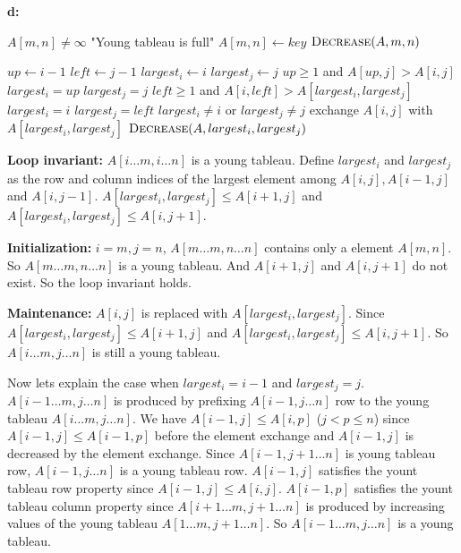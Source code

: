 \documentclass{book}
\begin{document}
\begin{CJK}{UTF8}{gkai}
\textbf{d:}
\begin{codebox}
\li \If $A[m,n] \ne \infty$
\li \Then \Error "Young tableau is full"
\End
\li $A[m,n] \gets key$
\li $\textnormal{\scshape Decrease}(A,m,n)$
\end{codebox}

\begin{codebox}
\li $up \gets i-1$
\li $left \gets j-1$
\li $largest_i \gets i$
\li $largest_j \gets j$
\li \If $up \ge 1$ and $A[up, j] > A[i,j]$
\li \Then $largest_i = up$
\li $largest_j = j$
\End
\li \If $left \ge 1$ and $A[i, left] > A[largest_i, largest_j]$
\li \Then $largest_i = i$
\li $largest_j = left$
\End
\li \If $largest_i \ne i$ or $largest_j \ne j$
\li \Then exchange $A[i,j]$ with $A[largest_i, largest_j]$
\li $\textnormal{\scshape Decrease}(A, largest_i, largest_j)$
\End
\end{codebox}
\textbf{Loop invariant:} $A[i\dots m, i\dots n]$ is a young tableau. Define 
$largest_i$ and $largest_j$ as the row and column indices of the largest element 
among $A[i,j], A[i-1,j]$ and $A[i,j-1]$. $A[largest_i, largest_j] \le A[i+1,j]$ 
and $A[largest_i, largest_j] \le A[i,j+1]$.

\textbf{Initialization:} $i=m, j=n$, $A[m\dots m, n\dots n]$ contains only a 
element $A[m,n]$. So $A[m\dots m,n\dots n]$ is a young tableau. And $A[i+1,j]$ 
and $A[i,j+1]$ do not exist. So the loop invariant holds.

\textbf{Maintenance:} $A[i,j]$ is replaced with $A[largest_i, largest_j]$. Since 
$A[largest_i, largest_j] \le A[i+1,j]$ and $A[largest_i, largest_j] \le 
A[i,j+1]$. So $A[i\dots m, j\dots n]$ is still a young tableau. 

Now lets explain the case when $largest_i = i-1$ and $largest_j = j$.  
$A[i-1\dots m, j\dots n]$ is produced by prefixing $A[i-1,j\dots n]$ row to the 
young tableau $A[i\dots m, j\dots n]$.  We have $A[i-1,j] \le A[i,p]$ ($j < p 
\le n$) since $A[i-1,j] \le A[i-1,p]$ before the element exchange and $A[i-1,j]$ 
is decreased by the element exchange.  Since $A[i-1,j+1\dots n]$ is young 
tableau row, $A[i-1,j\dots n]$ is a young tableau row.  $A[i-1,j]$ satisfies the 
yount tableau row property since $A[i-1,j] \le A[i,j]$.  $A[i-1,p]$ satisfies 
the yount tableau column property since $A[i+1\dots m, j+1 \dots n]$ is produced 
by increasing values of the young tableau $A[1\dots m, j+1\dots n]$. So 
$A[i-1\dots m,j\dots n]$ is a young tableau. 


\end{CJK}
\end{document}
